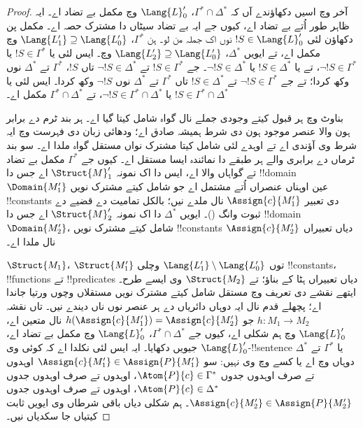 \documentclass[../../../include/open-logic-section]{subfiles}
\begin{document}
\begin{proof}
آخر وچ اسیں دکھاؤندے آں کہ
$\Gamma^* \cap \Delta^*$،
$\Lang{L}'_0$ وچ مکمل بے تضاد اے۔
ایہ ظاہر طور اُتے بے تضاد اے، کیوں
جے ایہ بے تضاد سیٹاں دا مشترک حصہ اے۔
مکمل پن دکھاؤن لئی $!S \in
\Lang{L}'_0$ نوں اک جملہ من لو۔ ہن $\Gamma^*$،
$\Lang{L'_1}
\supseteq \Lang{L'_0}$ وچ مکمل اے،
تے ایویں $\Delta^*$،
$\Lang{L'_2} \supseteq \Lang{L'_0}$
وچ۔ ایس لئی یا $!S \in \Gamma^*$
یا $\lnot !S \in \Gamma^*$، تے
یا $!S \in \Delta^*$ یا
$\lnot !S \in \Delta^*$۔ جے
$!S \in
\Gamma^*$ تے $\lnot !S \in \Delta^*$
تاں $!S$، $\Gamma^*$ تے
$\Delta^*$ نوں وکھ کردا؛ تے جے
$\lnot !S \in
\Gamma^*$ تے $!S \in \Delta^*$
تاں $\Gamma^*$ تے $\Delta^*$
نوں $\lnot !S$ وکھ کردا۔ ایس لئی
یا $!S \in
\Gamma^* \cap \Delta^*$ یا
$\lnot !S \in \Gamma^* \cap \Delta^*$،
تے $\Gamma^* \cap \Delta^*$
مکمل اے۔

بناوٹ وچ ہر قبول کیتے وجودی جملے نال گواہ شامل کیتا گیا اے۔
ہر بند ٹرم دے برابر ہون والا عنصر موجود ہون دی شرط ہمیشہ
صادق اے؛ ودھائی زبان دی فہرست وچ ایہ شرط وی آؤندی اے
تے اوہدے لئی شامل کیتا مشترک نواں مستقل گواہ ملدا اے۔
سو بند ٹرماں دے برابری والے ہر طبقے دا نمائندہ ایسا مستقل اے۔
کیوں جے $\Gamma^*$ مکمل بے تضاد تے گواہاں والا اے،
ایس دا اک نمونہ $\Struct{M}'_1$ اے
جس دا !!{domain} $\Domain{M'_1}$
عین اوہناں عنصراں اُتے مشتمل اے
جو شامل کیتے مشترک نویں !!{constant}s دی تعبیر
$\Assign{c}{M'_1}$ نال ملدے نیں؛
بالکل تمامیت دے قضیے دے ثبوت وانگ
()۔
ایویں $\Delta^*$ دا اک نمونہ
$\Struct{M}'_2$ اے جس دا !!{domain}
$\Domain{M'_2}$،
شامل کیتے مشترک نویں !!{constant}s دیاں تعبیراں
$\Assign{c}{M'_2}$ نال ملدا اے۔

$\Struct{M_1}$، $\Struct{M'_1}$
توں $\Lang{L'_1} \setminus \Lang{L'_0}$
وچلی !!{constant}s، !!{function}s تے
!!{predicate}s دیاں تعبیراں ہٹا کے
بناؤ؛ تے $\Struct{M_2}$ وی ایسے طرح۔
ایتھے نقشے دی تعریف وچ مستقل شامل کیتے مشترک نویں
مستقلاں وچوں ورتیا جاندا اے؛ پچھلے قدم نال ایہ دوہاں
دائریاں دے ہر عنصر نوں ناں دیندے نیں۔
تاں نقشہ $h \colon M_1 \to M_2$
جو $h(\Assign{c}{M'_1}) = \Assign{c}{M'_2}$
نال متعین اے، $\Lang{L}'_0$
وچ ہم شکلی اے، کیوں جے
$\Gamma^* \cap \Delta^*$،
$\Lang{L}'_0$ وچ مکمل بے تضاد اے،
جیویں دکھایا۔ ایہ ایس لئی نکلدا
اے کہ کوئی وی $\Lang{L}'_0$-!!{sentence}
یا $\Gamma^*$ تے $\Delta^*$ دوہاں
وچ اے یا کسے وچ وی نہیں: سو
$\Assign{c}{M'_1} \in
\Assign{P}{M'_1}$ اوہدوں تے صرف
اوہدوں جدوں $\Atom{P}{c} \in \Gamma^*$،
اوہدوں تے صرف اوہدوں جدوں
$\Atom{P}{c} \in \Delta^*$، اوہدوں
تے صرف اوہدوں جدوں
$\Assign{c}{M'_2} \in
\Assign{P}{M'_2}$۔ ہم شکلی دیاں
باقی شرطاں وی ایویں ثابت کیتیاں
جا سکدیاں نیں۔


\end{proof}
\end{document}
